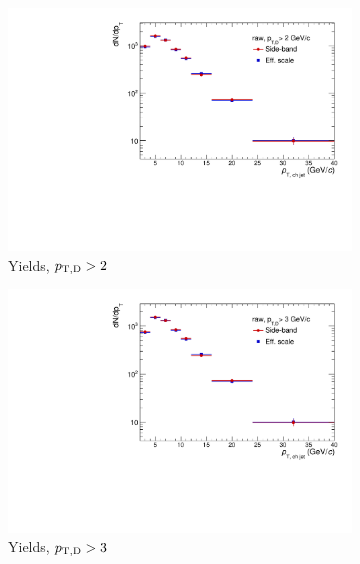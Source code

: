 \begin{figure}[bth]
\centering
\begin{subfigure}[b]{0.45\textwidth}
\includegraphics[width=\textwidth]{pPbplots/methodsComparison/DjetSpectra_methodComparison_FASTwoSDD_noEff_ptD2}
\caption{Yields, $p_{\mathrm{T,D}}>2$~\GeVc}
\end{subfigure}
\begin{subfigure}[b]{0.45\textwidth}
\includegraphics[width=\textwidth]{pPbplots/methodsComparison/DjetSpectra_methodComparison_FASTwoSDD_noEff_ptD3}
\caption{Yields, $p_{\mathrm{T,D}}>3$~\GeVc}
\end{subfigure}
\begin{subfigure}[c]{0.45\textwidth}

\end{subfigure}
\end{figure}
